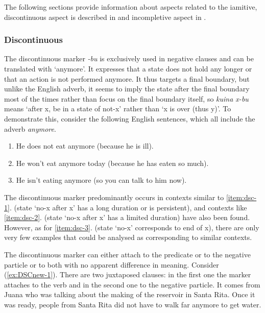 The following sections provide information about aspects related to the iamitive, discontinuous aspect is described in  and incompletive aspect in . 


\subsubsection{Discontinuous}\label{sec:Discontinuous}
The discontinuous marker \textit{-bu} is exclusively used in negative clauses and can be translated with ‘anymore’. It expresses that a state does not hold any longer or that an action is not performed anymore. It thus targets a final boundary, but unlike the English adverb, it seems to imply the state after the final boundary most of the times rather than focus on the final boundary itself, so \textit{kuina x-bu} means ‘after x, be in a state of not-x’ rather than ‘x is over (thus y)’. To demonstrate this, consider the following English sentences, which all include the adverb \textit{anymore}.

\begin{enumerate}
\item He does not eat anymore (because he is ill).\label{item:dsc-1}
\item He won’t eat anymore today (because he has eaten so much).\label{item:dsc-2}
\item He  isn’t eating anymore (so you can talk to him now).\label{item:dsc-3}
\end{enumerate}

The discontinuous marker predominantly occurs in contexts similar to \ref{item:dsc-1}. (state ‘no-x after x’ has a long duration or is persistent), and contexts like \ref{item:dsc-2}. (state ‘no-x after x’ has a limited duration) have also been found. However, as for \ref{item:dsc-3}. (state ‘no-x’ corresponds to end of x), there are only very few examples that could be analysed as corresponding to similar contexts. 
 
The discontinuous marker can either attach to the predicate or to the negative particle or to both with no apparent difference in meaning. Consider (\ref{ex:DSCnew-1}). There are two juxtaposed clauses: in the first one the marker attaches to the verb and in the second one to the negative particle. It comes from Juana who was talking about the making of the reservoir in Santa Rita. Once it was ready, people from Santa Rita did not have to walk far anymore to get water.


